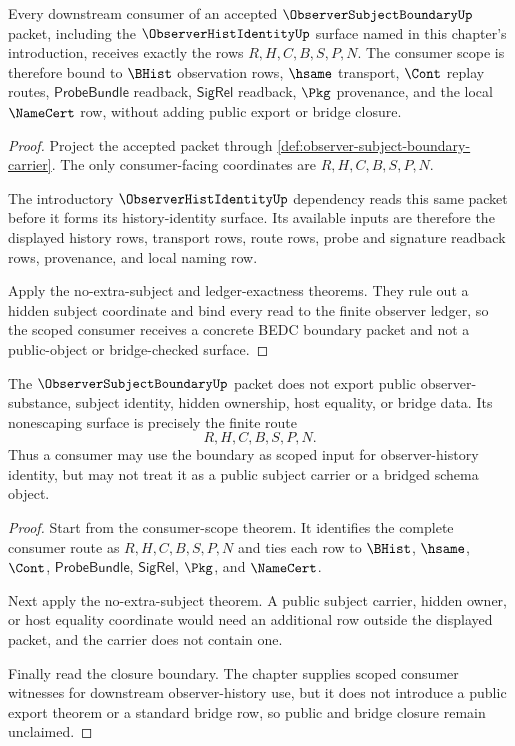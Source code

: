 \begin{theorem}
\label{thm:observer-subject-boundary-consumer-scope}
Every downstream consumer of an accepted $\ObserverSubjectBoundaryUp$ packet, including the $\ObserverHistIdentityUp$ surface named in this chapter's introduction, receives exactly the rows $R,H,C,B,S,P,N$. The consumer scope is therefore bound to $\BHist$ observation rows, $\hsame$ transport, $\Cont$ replay routes, $\mathsf{ProbeBundle}$ readback, $\mathsf{SigRel}$ readback, $\Pkg$ provenance, and the local $\NameCert$ row, without adding public export or bridge closure.
\end{theorem}
\begin{proof}
Project the accepted packet through \autoref{def:observer-subject-boundary-carrier}. The only consumer-facing coordinates are $R,H,C,B,S,P,N$.

The introductory $\ObserverHistIdentityUp$ dependency reads this same packet before it forms its history-identity surface. Its available inputs are therefore the displayed history rows, transport rows, route rows, probe and signature readback rows, provenance, and local naming row.

Apply the no-extra-subject and ledger-exactness theorems. They rule out a hidden subject coordinate and bind every read to the finite observer ledger, so the scoped consumer receives a concrete BEDC boundary packet and not a public-object or bridge-checked surface.
\end{proof}

\begin{theorem}
\label{thm:observer-subject-boundary-public-nonescape}
The $\ObserverSubjectBoundaryUp$ packet does not export public observer-substance, subject identity, hidden ownership, host equality, or bridge data. Its nonescaping surface is precisely the finite route
$$
R,H,C,B,S,P,N .
$$
Thus a consumer may use the boundary as scoped input for observer-history identity, but may not treat it as a public subject carrier or a bridged schema object.
\end{theorem}
\begin{proof}
Start from the consumer-scope theorem. It identifies the complete consumer route as $R,H,C,B,S,P,N$ and ties each row to $\BHist$, $\hsame$, $\Cont$, $\mathsf{ProbeBundle}$, $\mathsf{SigRel}$, $\Pkg$, and $\NameCert$.

Next apply the no-extra-subject theorem. A public subject carrier, hidden owner, or host equality coordinate would need an additional row outside the displayed packet, and the carrier does not contain one.

Finally read the closure boundary. The chapter supplies scoped consumer witnesses for downstream observer-history use, but it does not introduce a public export theorem or a standard bridge row, so public and bridge closure remain unclaimed.
\end{proof}

